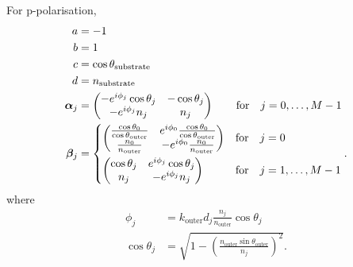 \documentclass[]{article}
\begin{document}
	For p-polarisation,
	\begin{align}
		a&=-1\\
		b&=1\\
		c&=\cos\theta_\text{substrate}\\
		d&=n_{\text{substrate}}\\
		\bm{\alpha}_j&=
		\begin{pmatrix}
			-e^{i\phi_{j}}\cos\theta_{j}&-\cos\theta_{j}\\
			-e^{i\phi_{j}}n_{j}&n_{j}
		\end{pmatrix}\quad\quad\text{for}\quad j=0,\dots,M-1\\
		\bm{\beta}_j&=
		\begin{dcases}
			\begin{pmatrix}
				\frac{\cos\theta_0}{\cos\theta_\text{outer}}&e^{i\phi_0}\frac{\cos\theta_0}{\cos\theta_\text{outer}}\\
				\frac{n_0}{n_\text{outer}}&-e^{i\phi_0}\frac{n_0}{n_\text{outer}}
			\end{pmatrix}&\text{for}\quad j=0\\
			\begin{pmatrix}
				\cos\theta_j&e^{i\phi_j}\cos\theta_j\\
				n_j&-e^{i\phi_j}n_j
			\end{pmatrix}&\text{for}\quad j=1,\dots,M-1
		\end{dcases}.
	\end{align}
	where 
	\begin{align}
		\phi_j&=k_\text{outer}d_j\frac{n_j}{n_\text{outer}}\cos\theta_{j}\\
		\cos\theta_j&=\sqrt{1-\left(\frac{n_\text{outer}\sin\theta_\text{outer}}{n_j}\right)^2}.
	\end{align}
\end{document}
